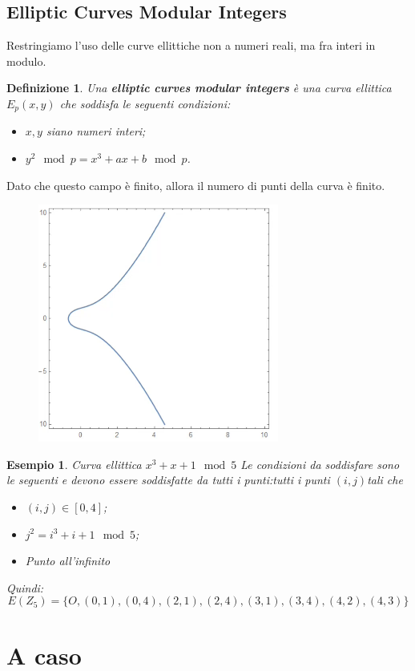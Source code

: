 \documentclass{book}
\newtheorem{Definizione}{\textbf{Definizione}}
\newtheorem{esempio}{\textcolor{Grey1}{Esempio}}
\newlength{\strutheight}
\begin{document}
\subsection{Elliptic Curves Modular Integers}
Restringiamo l'uso delle curve ellittiche non a numeri reali, ma fra interi in modulo.
\begin{Definizione}
	Una \textbf{elliptic curves modular integers} è una curva ellittica \(E_{p}(x,y)\) che soddisfa le seguenti condizioni:\begin{itemize}
		\item  \(x,y\) siano numeri interi;
		\item \(y^{2}\mod{p}=x^{3}+ax+b \mod{p}\).
	\end{itemize}
\end{Definizione}
Dato che questo campo è finito, allora il numero di punti della curva è finito\@.\newline
\begin{adjustbox}{valign=C,raise=\strutheight,minipage={1.0\linewidth}}
	\begin{figure}
		\centering
		\includegraphics[scale=0.45]{2022-01-11-18-42-46.png}%
	\end{figure}%
	\strut{}
\vspace*{-0.5cm} %
\begin{esempio}
		Curva ellittica \(x^{3}+x+1\mod{5}\)\newline
	Le condizioni da soddisfare sono le seguenti e devono essere soddisfatte da tutti i punti:tutti i punti \((i,j) \)tali che \begin{itemize}
		\item \((i,j)\in [0,4]\);
		\item \(j^{2}=i^{3}+i+1\mod{5}\);
		\item Punto all'infinito
	\end{itemize}
	Quindi:\begin{equation*}
		E(Z_{5})=\{O,(0,1),(0,4),(2,1),(2,4),(3,1),(3,4),(4,2),(4,3)\}
	\end{equation*}
\end{esempio}
\end{adjustbox}
\section{A caso}
\end{document}
